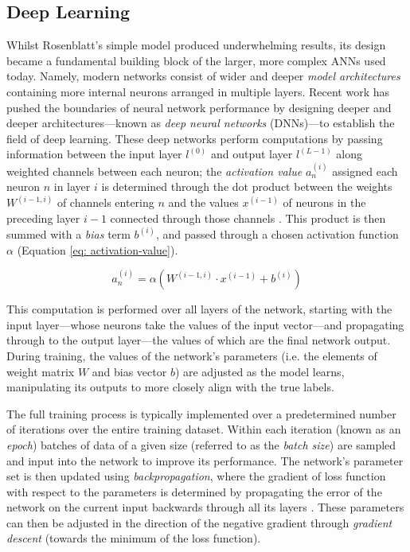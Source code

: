 \documentclass[a4paper, 11pt]{report}
\begin{document}
    \subsection{Deep Learning}
    \label{section: deep-learning}

    Whilst Rosenblatt's simple model produced underwhelming results, its design became a fundamental building block of the larger, more complex ANNs used today. Namely, modern networks consist of wider and deeper \emph{model architectures} containing more internal neurons arranged in multiple layers. Recent work has pushed the boundaries of neural network performance by designing deeper and deeper architectures---known as \emph{deep neural networks} (DNNs)---to establish the field of deep learning. These deep networks perform computations by passing information between the input layer $l^{(0)}$ and output layer $l^{(L-1)}$ along weighted channels between each neuron; the \emph{activation value} $a^{(i)}_n$ assigned each neuron $n$ in layer $i$ is determined through the dot product between the weights $W^{(i-1, i)}$ of channels entering $n$ and the values $x^{(i-1)}$ of neurons in the preceding layer $i-1$ connected through those channels \citep{witten-2017}. This product is then summed with a \emph{bias} term $b^{(i)}$, and passed through a chosen activation function $\alpha$ (Equation \ref{eq: activation-value}).

    \begin{equation}
        \label{eq: activation-value}
        a^{(i)}_n = \alpha( W^{(i-1, i)} \cdot x^{(i-1)} + b^{(i)} )
    \end{equation}

    This computation is performed over all layers of the network, starting with the input layer---whose neurons take the values of the input vector---and propagating through to the output layer—the values of which are the final network output. During training, the values of the network's parameters (i.e. the elements of weight matrix $W$ and bias vector $b$) are adjusted as the model learns, manipulating its outputs to more closely align with the true labels. 
    
    The full training process is typically implemented over a predetermined number of iterations over the entire training dataset. Within each iteration (known as an \emph{epoch}) batches of data of a given size (referred to as the \emph{batch size}) are sampled and input into the network to improve its performance. The network's parameter set is then updated using \emph{backpropagation}, where the gradient of loss function with respect to the parameters is determined by propagating the error of the network on the current input backwards through all its layers \citep{zaras-2022}. These parameters can then be adjusted in the direction of the negative gradient through \emph{gradient descent} (towards the minimum of the loss function).
\end{document}
